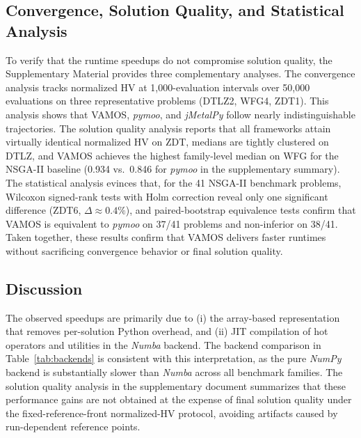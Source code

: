 \documentclass[journal]{IEEEtran}
\newcommand{\VAMOS}{VAMOS}
\begin{document}

\subsection{Convergence, Solution Quality, and Statistical Analysis}
To verify that the runtime speedups do not compromise solution quality, the Supplementary Material provides three complementary analyses. The convergence analysis tracks normalized HV at 1{,}000-evaluation intervals over 50{,}000 evaluations on three representative problems (DTLZ2, WFG4, ZDT1). This analysis shows that \VAMOS{}, \textit{pymoo}, and \textit{jMetalPy} follow nearly indistinguishable trajectories. The solution quality analysis reports that all frameworks attain virtually identical normalized HV on ZDT, medians are tightly clustered on DTLZ, and \VAMOS{} achieves the highest family-level median on WFG for the NSGA-II baseline (0.934 vs.\ 0.846 for \textit{pymoo} in the supplementary summary). The statistical analysis evinces that, for the 41 NSGA-II benchmark problems, Wilcoxon signed-rank tests with Holm correction reveal only one significant difference (ZDT6, $\Delta \approx 0.4\%$), and paired-bootstrap equivalence tests confirm that \VAMOS{} is equivalent to \textit{pymoo} on 37/41 problems and non-inferior on 38/41. Taken together, these results confirm that \VAMOS{} delivers faster runtimes without sacrificing convergence behavior or final solution quality.

\subsection{Discussion}
\label{sec:discussion}

The observed speedups are primarily due to (i) the array-based representation that removes per-solution Python overhead, and (ii) JIT compilation of hot operators and utilities in the \textit{Numba} backend. The backend comparison in Table~\ref{tab:backends} is consistent with this interpretation, as the pure \textit{NumPy} backend is substantially slower than \textit{Numba} across all benchmark families. The solution quality analysis in the supplementary document summarizes that these performance gains are not obtained at the expense of final solution quality under the fixed-reference-front normalized-HV protocol, avoiding artifacts caused by run-dependent reference points.
\end{document}
